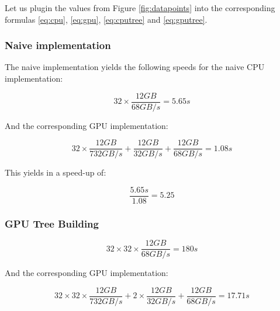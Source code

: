\documentclass[]{article}
\begin{document}
Let us plugin the values from Figure \ref{fig:datapoints} into the corresponding formulas \ref{eq:cpu}, \ref{eq:gpu}, \ref{eq:cputree} and \ref{eq:gputree}.

\subsubsection{Naive implementation}
The naive implementation yields the following speeds for the naive CPU  implementation:

\begin{center}
	\begin{equation}
		32 \times \frac{ 12 GB }{68 GB/s} = 5.65s
	\end{equation}
\end{center}


And the corresponding GPU implementation:
\begin{center}
	\begin{equation}
		32 \times \frac{12 GB}{732 GB/s} + \frac{12 GB}{32 GB/s}  + \frac{12 GB}{68 GB/s} = 1.08s
	\end{equation}
\end{center}



This yields in a speed-up of:
\begin{center}
	\begin{equation}
		\frac{5.65s}{1.08} = 5.25
	\end{equation}
\end{center}


\subsubsection{GPU Tree Building}

\begin{center}
	\begin{equation}
		32 \times 32 \times \frac{ 12 GB }{68 GB/s} = 180s
	\end{equation}
\end{center}

And the corresponding GPU implementation:
\begin{center}
	\begin{equation}
		32 \times 32 \times \frac{12 GB}{732 GB/s} + 2 \times \frac{12 GB}{32 GB/s}  + \frac{12 GB}{68 GB/s} = 17.71s
	\end{equation}
\end{center}
\end{document}
